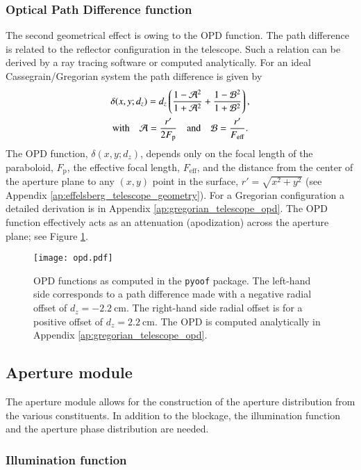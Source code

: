 \documentclass[
    ]
    {aa}
\begin{document}
    \subsubsection{Optical Path Difference function}
    The second geometrical effect is owing to the OPD function. The path difference is related to the reflector configuration in the telescope. Such a relation can be derived by a ray tracing software or computed analytically. For an ideal Cassegrain/Gregorian system the path difference is given by
    \begin{gather}
        \delta(x,y;d_z) = d_z\del{ \frac{1-\mathcal{A}^2}{1+\mathcal{A}^2} + \frac{1-\mathcal{B}^2}{1+\mathcal{B}^2}}, \label{eq:opd} \\
        \text{with} \quad \mathcal{A} = \frac{r'}{2F_\text{p}} \quad\text{and}\quad \mathcal{B}=\frac{r'}{F_\text{eff}}.
    \end{gather}
    The OPD function, $\delta(x, y;d_z)$, depends only on the focal length of the paraboloid, $F_\text{p}$, the effective focal length, $F_\text{eff}$, and the distance from the center of the aperture plane to any $(x, y)$ point in the surface, $r'=\sqrt{x^2 + y^2}$ (see Appendix \ref{ap:effelsberg_telescope_geometry}). For a Gregorian configuration a detailed derivation is in Appendix \ref{ap:gregorian_telescope_opd}.
    The OPD function effectively acts as an attenuation (apodization) across the aperture plane; see Figure \ref{fig:opd}.
    \begin{figure}
        \centering
        \texttt{[image: opd.pdf]}
        \caption{OPD functions as computed in the \texttt{pyoof} package. The left-hand side corresponds to a path difference made with a negative radial offset of $d_z=\SI{-2.2}{\cm}$. The right-hand side radial offset is for a positive offset of $d_z=\SI{2.2}{\cm}$. The OPD is computed analytically in Appendix \ref{ap:gregorian_telescope_opd}.}
        \label{fig:opd}
    \end{figure}

    \subsection{Aperture module}
    \label{sec:aperture_module}

    The aperture module allows for the construction of the aperture distribution from the various constituents. In addition to the blockage, the illumination function and the aperture phase distribution are needed.

    \subsubsection{Illumination function}
    
\end{document}
